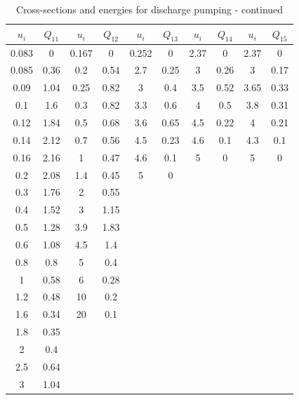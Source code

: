 \documentclass{report}
\begin{document}
\begin{appendices}
\begin{table}
\centering
\caption{Cross-sections and energies for discharge pumping - continued}
\begin{tabular}{|c|c||c|c||c|c||c|c||c|c|}
\hline 
$u_i$ & $Q_{11}$ & $u_i$ & $Q_{12}$ & $u_i$ & $Q_{13}$ & $u_i$ & $Q_{14}$ & $u_i$ & $Q_{15}$ \\
\hline 
0.083 & 0    & 0.167 & 0    & 0.252 & 0    & 2.37 & 0    & 2.37 & 0    \\
0.085 & 0.36 & 0.2   & 0.54 & 2.7   & 0.25 & 3    & 0.26 & 3    & 0.17 \\
0.09  & 1.04 & 0.25  & 0.82 & 3     & 0.4  & 3.5  & 0.52 & 3.65 & 0.33 \\
0.1   & 1.6  & 0.3   & 0.82 & 3.3   & 0.6  & 4    & 0.5  & 3.8  & 0.31 \\
0.12  & 1.84 & 0.5   & 0.68 & 3.6   & 0.65 & 4.5  & 0.22 & 4    & 0.21 \\
0.14  & 2.12 & 0.7   & 0.56 & 4.5   & 0.23 & 4.6  & 0.1  & 4.3  & 0.1  \\
0.16  & 2.16 & 1     & 0.47 & 4.6   & 0.1  & 5    & 0    & 5    & 0    \\
0.2   & 2.08 & 1.4   & 0.45 & 5     & 0    &      &      &      &      \\
0.3   & 1.76 & 2     & 0.55 &       &      &      &      &      &      \\
0.4   & 1.52 & 3     & 1.15 &       &      &      &      &      &      \\
0.5   & 1.28 & 3.9   & 1.83 &       &      &      &      &      &      \\
0.6   & 1.08 & 4.5   & 1.4  &       &      &      &      &      &      \\
0.8   & 0.8  & 5     & 0.4  &       &      &      &      &      &      \\
1     & 0.58 & 6     & 0.28 &       &      &      &      &      &      \\
1.2   & 0.48 & 10    & 0.2  &       &      &      &      &      &      \\
1.6   & 0.34 & 20    & 0.1  &       &      &      &      &      &      \\
1.8   & 0.35 &       &      &       &      &      &      &      &      \\
2     & 0.4  &       &      &       &      &      &      &      &      \\ 
2.5   & 0.64 &       &      &       &      &      &      &      &      \\ 
3     & 1.04 &       &      &       &      &      &      &      &      \\ 

\end{tabular}
\end{table}
\end{appendices}
\end{document}
